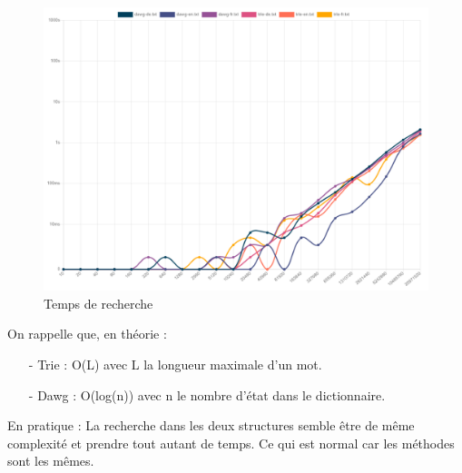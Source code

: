 \begin{figure}[H]
    \centering
    \includegraphics[scale=0.5]{images/time_search.png}
    \caption{\label{HomePage} Temps de recherche}
\end{figure}

On rappelle que, en théorie :
\begin{itemize}
  \item[-] Trie : O(L) avec L la longueur maximale d'un mot.
  \item[-] Dawg : O(log(n)) avec n le nombre d'état dans le dictionnaire.
\end{itemize} \leavevmode

En pratique : \medskip \newline
La recherche dans les deux structures semble être de même complexité et prendre tout autant de temps. \newline Ce qui est normal car les méthodes sont les mêmes.
